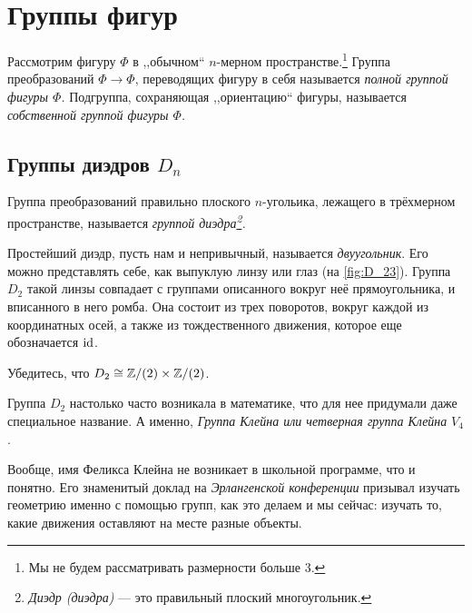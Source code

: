 \section{Группы фигур}
Рассмотрим фигуру $\Phi$ в ,,обычном`` $n$-мерном пространстве.\footnote{Мы не будем рассматривать размерности больше 3.} Группа преобразований $\Phi \to \Phi$, переводящих фигуру в себя называется \emph{полной группой фигуры $\Phi$.} Подгруппа, сохраняющая ,,ориентацию`` фигуры, называется \emph{собственной группой фигуры $\Phi$.}

\subsection{Группы диэдров $D_n$}
\begin{definition}
    Группа преобразований правильно плоского $n$-угольика, лежащего в трёхмерном пространстве, называется \emph{группой диэдра\footnote{\emph{Диэдр (диэдра)} --- это правильный плоский многоугольник.
}.} 
\end{definition}
\begin{example}
    Простейший диэдр, пусть нам и непривычный, называется \emph{двуугольник}. Его можно представлять себе, как выпуклую линзу или глаз (на \cref{fig:D_23}). Группа $D_2$ такой линзы совпадает с группами описанного вокруг неё прямоугольника, и вписанного в него ромба. Она состоит из трех поворотов, вокруг каждой из координатных осей, а также из тождественного движения, которое еще обозначается $\operatorname{id}$.
\end{example}

\begin{practice}
    Убедитесь, что $D_2 \cong \mathbb Z/(2) \times \mathbb Z/(2)$.
\end{practice}

Группа $D_2$ настолько часто возникала в математике, что для нее придумали даже специальное название. А именно, \emph{Группа Клейна или четверная группа Клейна} $V_4$.

Вообще, имя Феликса Клейна не возникает в школьной программе, что и понятно. Его знаменитый доклад на \emph{Эрлангенской конференции} призывал изучать геометрию именно с помощью групп, как это делаем и мы сейчас: изучать то, какие движения оставляют на месте разные объекты.

